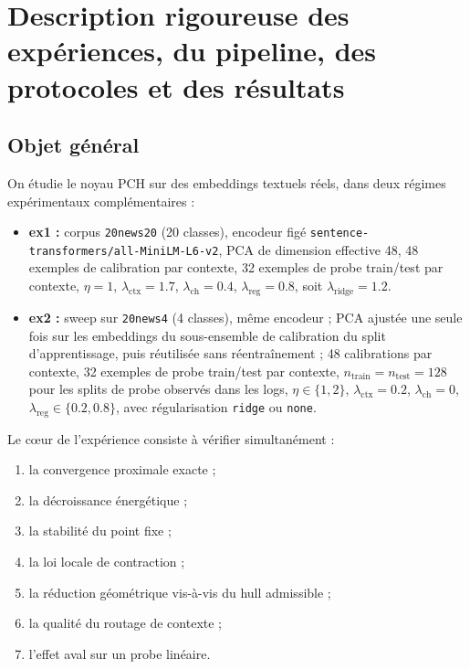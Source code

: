 

\section{Description rigoureuse des expériences, du pipeline, des protocoles et des résultats}

\subsection{Objet général}

On étudie le noyau PCH sur des embeddings textuels réels, dans deux régimes expérimentaux complémentaires :

\begin{itemize}
    \item \textbf{ex1 :} corpus \texttt{20news20} (20 classes), encodeur figé \texttt{sentence-transformers/all-MiniLM-L6-v2}, PCA de dimension effective 48, 48 exemples de calibration par contexte, 32 exemples de probe train/test par contexte, \(\eta=1\), \(\lambda_{\mathrm{ctx}}=1.7\), \(\lambda_{\mathrm{ch}}=0.4\), \(\lambda_{\mathrm{reg}}=0.8\), soit \(\lambda_{\mathrm{ridge}}=1.2\).
    \item \textbf{ex2 :} sweep sur \texttt{20news4} (4 classes), même encodeur ; PCA ajustée une seule fois sur les embeddings du sous-ensemble de calibration du split d’apprentissage, puis réutilisée sans réentraînement ; 48 calibrations par contexte, 32 exemples de probe train/test par contexte, \(n_{\text{train}}=n_{\text{test}}=128\) pour les splits de probe observés dans les logs, \(\eta\in\{1,2\}\), \(\lambda_{\mathrm{ctx}}=0.2\), \(\lambda_{\mathrm{ch}}=0\), \(\lambda_{\mathrm{reg}}\in\{0.2,0.8\}\), avec régularisation \texttt{ridge} ou \texttt{none}.
\end{itemize}

Le cœur de l'expérience consiste à vérifier simultanément :
\begin{enumerate}
    \item la convergence proximale exacte ;
    \item la décroissance énergétique ;
    \item la stabilité du point fixe ;
    \item la loi locale de contraction ;
    \item la réduction géométrique vis-à-vis du hull admissible ;
    \item la qualité du routage de contexte ;
    \item l'effet aval sur un probe linéaire.
\end{enumerate}


